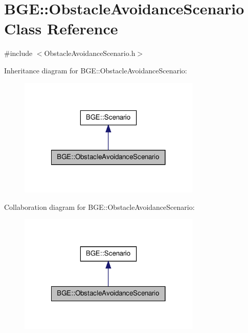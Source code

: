 \hypertarget{class_b_g_e_1_1_obstacle_avoidance_scenario}{\section{B\-G\-E\-:\-:Obstacle\-Avoidance\-Scenario Class Reference}
\label{class_b_g_e_1_1_obstacle_avoidance_scenario}
}


{\ttfamily \#include $<$Obstacle\-Avoidance\-Scenario.\-h$>$}



Inheritance diagram for B\-G\-E\-:\-:Obstacle\-Avoidance\-Scenario\-:
\nopagebreak
\begin{figure}[H]
\begin{center}
\leavevmode
\includegraphics[width=246pt]{class_b_g_e_1_1_obstacle_avoidance_scenario__inherit__graph}
\end{center}
\end{figure}


Collaboration diagram for B\-G\-E\-:\-:Obstacle\-Avoidance\-Scenario\-:
\nopagebreak
\begin{figure}[H]
\begin{center}
\leavevmode
\includegraphics[width=246pt]{class_b_g_e_1_1_obstacle_avoidance_scenario__coll__graph}
\end{center}
\end{figure}
